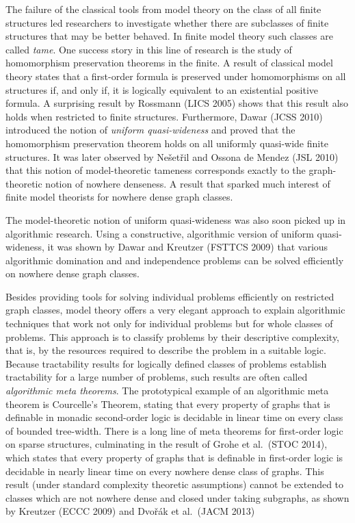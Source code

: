 The failure of the classical tools from model theory on the class 
of all finite structures led researchers to investigate whether
there are subclasses of finite structures that may be 
better behaved. In finite model 
theory such classes are called \emph{tame}. One success story 
in this line of research is the study of homomorphism
preservation theorems in the finite. A result of classical model 
theory states that a first-order formula is preserved under
homomorphisms on all structures if, and only if, it is logically 
equivalent to an existential positive formula. A surprising 
result by Rossmann (LICS 2005) shows that this result also holds when 
restricted to finite structures. Furthermore, Dawar (JCSS 2010) introduced
the notion of \emph{uniform quasi-wideness} and proved 
that the homomorphism preservation theorem holds on all
uniformly quasi-wide finite structures. It was later observed 
by Ne\v{s}et\v{r}il and Ossona de Mendez (JSL 2010) that this notion 
of model-theoretic tameness corresponds exactly to the 
graph-theoretic notion of nowhere denseness. A result that
sparked much interest of finite model theorists for nowhere
dense graph classes.

The model-theoretic notion of uniform quasi-wideness was 
also soon picked up in algorithmic research. Using a constructive, 
algorithmic version of uniform quasi-wideness, it was shown
by Dawar and Kreutzer (FSTTCS 2009) that various algorithmic domination and 
and independence problems can be solved efficiently on 
nowhere dense graph classes. 

Besides providing tools for solving
individual problems efficiently on restricted graph classes, 
model theory offers a very elegant 
approach to explain algorithmic techniques that work not only for 
individual problems but for whole classes of problems. This
approach is to classify problems by their descriptive complexity, 
that is, by the resources required to describe the problem in a 
suitable logic. Because tractability results for logically defined 
classes of problems establish tractability for a large number of
problems, such results are often called \emph{algorithmic meta theorems}. The prototypical example of an algorithmic
meta theorem is Courcelle’s Theorem, stating that 
every property of graphs that is definable in monadic second-order 
logic is decidable in linear time on every class of bounded tree-width.
There is a long line of meta theorems for first-order logic on sparse
structures, culminating in the result of Grohe et al.\ (STOC 2014), which states
that every property of graphs that is definable in first-order logic 
is decidable in nearly linear time on every nowhere dense class 
of graphs. This result (under standard complexity theoretic
assumptions) cannot be extended to
classes which are not nowhere dense and closed under taking
subgraphs, as shown by Kreutzer (ECCC 2009) and Dvo\v{r}\'ak et al.\ (JACM 2013)

